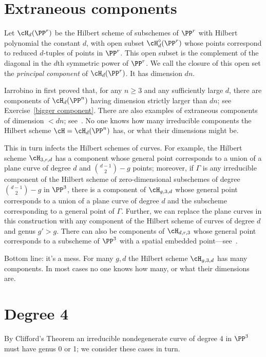 \section{Extraneous components}

 Let $\cH_d(\PP^r)$ be the Hilbert scheme of subschemes of $\PP^r$ with Hilbert polynomial the constant $d$, with open subset $\cH^\circ_d(\PP^r)$ whose points correspond to reduced $d$-tuples of points in $\PP^r$. This open subset is the complement of the diagonal in the $d$th symmetric power of $\PP^r$. We call the closure of this open set the \emph{principal component} of $\cH_d(\PP^r)$. It has dimension $dn$.

Iarrobino in \cite{Iarrobino1985} first proved that, for any $n \geq 3$ and any sufficiently large $d$, there are components of $\cH_d(\PP^n)$ having dimension strictly larger than $dn$; see Exercise~\ref{bigger component}. There are also examples of extraneous components
of dimension $<dn$; see~\cite{MR2579394}. No one knows how many irreducible components the Hilbert scheme $\cH = \cH_d(\PP^n)$ has, or what their dimensions might be.

This in turn infects the Hilbert schemes of curves. For example, the Hilbert scheme $\cH_{3,r,d}$ has a component whose general point corresponds to a union of a plane curve of degree $d$ and $\binom{d-1}{2} - g$ points; moreover, if $\Gamma$ is any irreducible component of the Hilbert scheme of zero-dimensional subschemes of degree $\binom{d-1}{2} - g$ in $\PP^3$, there is a component of $\cH_{g,3,d}$ whose  general point corresponds to a union of a plane curve of degree $d$ and the subscheme corresponding to a general point of $\Gamma$. Further, we can replace the plane curves in this construction with any component of the Hilbert scheme of curves of degree $d$ and genus $g' > g$. There can also be components of $\cH_{d,r,3}$ whose general point corresponds to a subscheme of $\PP^3$ with a spatial embedded point---see~\cite{Chen-Nollet}.

Bottom line: it's a mess. For many $g,d$ the Hilbert scheme $\cH_{g,3,d}$ has many components. In most cases no one knows how many, or what their dimensions are. 

\section{Degree 4}

By Clifford's Theorem  an irreducible nondegenerate curve of degree 4 in $\PP^{3}$ must have genus 0 or 1; we consider these cases in turn.

